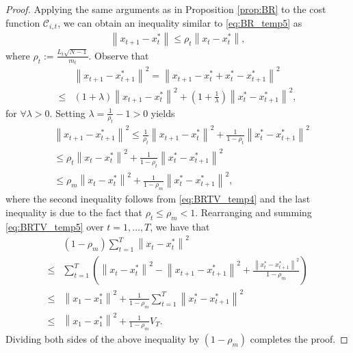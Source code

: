 \begin{proof}
Applying the same arguments as in Proposition \ref{prop:BR} to the cost function $\mathcal{C}_{i,t}$, we can obtain an inequality similar to \eqref{eq:BR_temp5} as
\begin{align}\label{eq:BRTV_temp4}
    \left\| x_{t+1}-x_{t}^{*}  \right\| 
    \leq  \rho_t  \left\| x_{t} - x_{t}^{*}\right\|,
\end{align}
where $\rho_t:=  \frac{L_t\sqrt{N-1}}{m_t} $.
Observe that 
\begin{align*}
    &\left\| x_{t+1}-x_{t+1}^{*}  \right\|^2 = \left\| x_{t+1}- x_{t}^{*} + x_{t}^{*}- x_{t+1}^{*}  \right\|^2 \nonumber \\
    \leq &(1+\lambda) \left\| x_{t+1}- x_{t}^{*}\right\|^2 + (1+\frac{1}{\lambda}) \left\|x_{t}^{*}- x_{t+1}^{*}  \right\|^2,
\end{align*}
for $\forall \lambda >0$. Setting $\lambda = \frac{1}{\rho_t}-1>0$ yields 
\begin{align}\label{eq:BRTV_temp5}
    &\left\| x_{t+1}-x_{t+1}^{*}  \right\|^2 
    \leq \frac{1}{\rho_t } \left\| x_{t+1}- x_{t}^{*}\right\|^2 + \frac{1}{1-\rho_t } \left\|x_{t}^{*}- x_{t+1}^{*}  \right\|^2 \nonumber \\
    & \leq  \rho_t \left\| x_{t}- x_{t}^{*}\right\|^2 + \frac{1}{1-\rho_t } \left\|x_{t}^{*}- x_{t+1}^{*}  \right\|^2 \nonumber \\
    & \leq  \rho_m \left\| x_{t}- x_{t}^{*}\right\|^2 + \frac{1}{1-\rho_m } \left\|x_{t}^{*}- x_{t+1}^{*}  \right\|^2,
\end{align}
where the second inequality follows from \eqref{eq:BRTV_temp4} and the last inequality is due to the fact that $\rho_t \leq \rho_m <1$. Rearranging and summing \eqref{eq:BRTV_temp5} over $t=1,\ldots,T$, we have that
\begin{align*}
    &(1-\rho_m) \sum_{t=1}^T \left\| x_{t}- x_{t}^{*}\right\|^2 \nonumber \\
    \leq & \sum_{t=1}^T \left(\left\| x_{t}- x_{t}^{*}\right\|^2 - \left\| x_{t+1}-x_{t+1}^{*}  \right\|^2 + \frac{\left\|x_{t}^{*}- x_{t+1}^{*}  \right\|^2}{1-\rho_m } \right) \nonumber \\
    \leq & \left\| x_{1}- x_{1}^{*}\right\|^2 +\frac{1}{1-\rho_m } \sum_{t=1}^T\left\|x_{t}^{*}- x_{t+1}^{*}  \right\|^2 \nonumber \\
    \leq & \left\| x_{1}- x_{1}^{*}\right\|^2 +  \frac{1}{1-\rho_m } V_T.
\end{align*}
Dividing both sides of the above inequality by $(1-\rho_m)$ completes the proof.
\end{proof}

